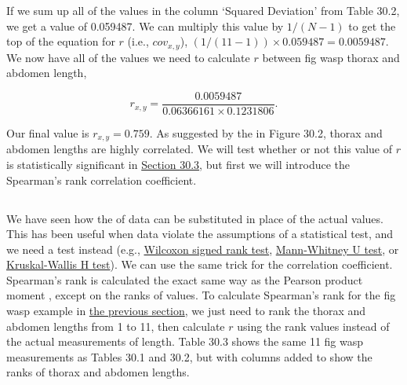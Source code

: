 \documentclass[
  openany]{krantz}
\begin{document}
If we sum up all of the values in the column `Squared Deviation' from Table 30.2, we get a value of 0.059487.
We can multiply this value by \(1 / (N - 1)\) to get the top of the equation for \(r\) (i.e., \(cov_{x,y}\)), \((1 / (11-1)) \times 0.059487 = 0.0059487\).
We now have all of the values we need to calculate \(r\) between fig wasp thorax and abdomen length,

\[r_{x,y} = \frac{0.0059487}{0.06366161 \times 0.1231806}.\]

Our final value is \(r_{x, y} = 0.759\).
As suggested by the  in Figure 30.2, thorax and abdomen lengths are highly correlated.
We will test whether or not this value of \(r\) is statistically significant in \protect\hyperlink{correlation-hypothesis-testing}{Section 30.3}, but first we will introduce the Spearman's rank correlation coefficient.

\hypertarget{section-1}{%
\subsection{\texorpdfstring{}{}}\label{section-1}}

We have seen how the \emph{} of data can be substituted in place of the actual values.
This has been useful when data violate the assumptions of a statistical test, and we need a  test instead (e.g., \protect\hyperlink{wilcoxon-test-1}{Wilcoxon signed rank test}, \protect\hyperlink{mann-whitney-u-test-1}{Mann-Whitney U test}, or \protect\hyperlink{Chapter_26}{Kruskal-Wallis H test}).
We can use the same trick for the correlation coefficient.
Spearman's rank  is calculated the exact same way as the Pearson product moment , except on the ranks of values.
To calculate Spearman's rank  for the fig wasp example in \protect\hyperlink{pearson-product-moment-correlation-coefficient}{the previous section}, we just need to rank the thorax and abdomen lengths from 1 to 11, then calculate \(r\) using the rank values instead of the actual measurements of length.
Table 30.3 shows the same 11 fig wasp measurements as Tables 30.1 and 30.2, but with columns added to show the ranks of thorax and abdomen lengths.
\end{document}
